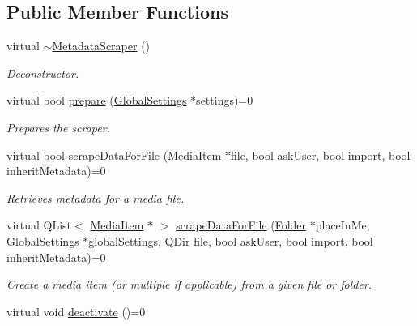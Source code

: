 \subsection*{Public Member Functions}
\begin{DoxyCompactItemize}
\item 
\hypertarget{class_a_w_e_1_1_metadata_scraper_a0a7ae0178e838b07bbd960be7c9e7dac}{virtual \hyperlink{class_a_w_e_1_1_metadata_scraper_a0a7ae0178e838b07bbd960be7c9e7dac}{$\sim$\-Metadata\-Scraper} ()}\label{class_a_w_e_1_1_metadata_scraper_a0a7ae0178e838b07bbd960be7c9e7dac}

\begin{DoxyCompactList}\small\item\em Deconstructor. \end{DoxyCompactList}\item 
virtual bool \hyperlink{class_a_w_e_1_1_metadata_scraper_a92f9039770add633140b825bf41bc30a}{prepare} (\hyperlink{class_a_w_e_1_1_global_settings}{Global\-Settings} $\ast$settings)=0
\begin{DoxyCompactList}\small\item\em Prepares the scraper. \end{DoxyCompactList}\item 
virtual bool \hyperlink{class_a_w_e_1_1_metadata_scraper_a14f10736d12ada980b4c64a906ebe9a6}{scrape\-Data\-For\-File} (\hyperlink{class_a_w_e_1_1_media_item}{Media\-Item} $\ast$file, bool ask\-User, bool import, bool inherit\-Metadata)=0
\begin{DoxyCompactList}\small\item\em Retrieves metadata for a media file. \end{DoxyCompactList}\item 
virtual Q\-List$<$ \hyperlink{class_a_w_e_1_1_media_item}{Media\-Item} $\ast$ $>$ \hyperlink{class_a_w_e_1_1_metadata_scraper_af3708cc05181299d7c5b37afc1568b3d}{scrape\-Data\-For\-File} (\hyperlink{class_a_w_e_1_1_folder}{Folder} $\ast$place\-In\-Me, \hyperlink{class_a_w_e_1_1_global_settings}{Global\-Settings} $\ast$global\-Settings, Q\-Dir file, bool ask\-User, bool import, bool inherit\-Metadata)=0
\begin{DoxyCompactList}\small\item\em Create a media item (or multiple if applicable) from a given file or folder. \end{DoxyCompactList}\item 
virtual void \hyperlink{class_a_w_e_1_1_metadata_scraper_a9a90e9974be775dff73c004ada209cb0}{deactivate} ()=0

\end{DoxyCompactItemize}
